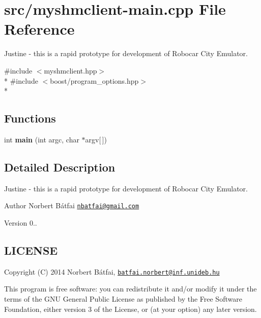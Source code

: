 \hypertarget{myshmclient-main_8cpp}{\section{src/myshmclient-\/main.cpp File Reference}
\label{myshmclient-main_8cpp}
}


Justine -\/ this is a rapid prototype for development of Robocar City Emulator.  


{\ttfamily \#include $<$myshmclient.\-hpp$>$}\\*
{\ttfamily \#include $<$boost/program\-\_\-options.\-hpp$>$}\\*
\subsection*{Functions}
\begin{DoxyCompactItemize}
\item 
\hypertarget{myshmclient-main_8cpp_a0ddf1224851353fc92bfbff6f499fa97}{int {\bfseries main} (int argc, char $\ast$argv\mbox{[}$\,$\mbox{]})}\label{myshmclient-main_8cpp_a0ddf1224851353fc92bfbff6f499fa97}

\end{DoxyCompactItemize}


\subsection{Detailed Description}
Justine -\/ this is a rapid prototype for development of Robocar City Emulator. \begin{DoxyAuthor}{Author}
Norbert Bátfai \href{mailto:nbatfai@gmail.com}{\tt nbatfai@gmail.\-com} 
\end{DoxyAuthor}
\begin{DoxyVersion}{Version}
0..
\end{DoxyVersion}
\hypertarget{traffic_8cpp_LICENSE}{}\subsection{L\-I\-C\-E\-N\-S\-E}\label{traffic_8cpp_LICENSE}
Copyright (C) 2014 Norbert Bátfai, \href{mailto:batfai.norbert@inf.unideb.hu}{\tt batfai.\-norbert@inf.\-unideb.\-hu}

This program is free software\-: you can redistribute it and/or modify it under the terms of the G\-N\-U General Public License as published by the Free Software Foundation, either version 3 of the License, or (at your option) any later version.

